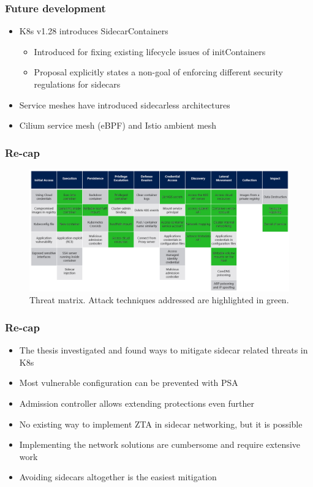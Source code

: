 \documentclass{beamer}
\begin{document}
\begin{frame}
\frametitle{Future development}

\begin{itemize}
  \item K8s v1.28 introduces SidecarContainers
  \begin{itemize}
    \item Introduced for fixing existing lifecycle issues of initContainers
    \item Proposal explicitly states a non-goal of enforcing different security regulations for sidecars
  \end{itemize}
  \item Service meshes have introduced sidecarless architectures
  \item Cilium service mesh (eBPF) and Istio ambient mesh
\end{itemize}
\end{frame}

\begin{frame}
\frametitle{Re-cap}

\begin{figure}[h!]
  \centering
  \includegraphics[width=\linewidth]{../thesis/files/Matrix.png}
  \caption{Threat matrix. Attack techniques addressed are highlighted in green.}
\end{figure}

\end{frame}

\begin{frame}
\frametitle{Re-cap}

\begin{itemize}
  \item The thesis investigated and found ways to mitigate sidecar related threats in K8s
  \item Most vulnerable configuration can be prevented with PSA
  \item Admission controller allows extending protections even further
  \item No existing way to implement ZTA in sidecar networking, but it is possible
  \item Implementing the network solutions are cumbersome and require extensive work
  \item Avoiding sidecars altogether is the easiest mitigation
\end{itemize}
\end{frame}
\end{document}
